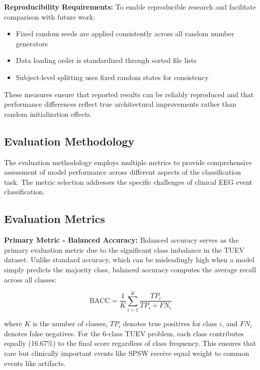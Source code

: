 \textbf{Reproducibility Requirements:} To enable reproducible research and facilitate comparison with future work:
\begin{itemize}
    \item Fixed random seeds are applied consistently across all random number generators
    \item Data loading order is standardized through sorted file lists
    \item Subject-level splitting uses fixed random states for consistency
\end{itemize}

These measures ensure that reported results can be reliably reproduced and that performance differences reflect true architectural improvements rather than random initialization effects.

\subsection{Evaluation Methodology}
\label{sec:evaluation_methodology}

The evaluation methodology employs multiple metrics to provide comprehensive assessment of model performance across different aspects of the classification task. The metric selection addresses the specific challenges of clinical \ac{EEG} event classification.

\subsection{Evaluation Metrics}
\label{sec:evaluation_metrics}

\textbf{Primary Metric - Balanced Accuracy:} Balanced accuracy serves as the primary evaluation metric due to the significant class imbalance in the \ac{TUEV} dataset. Unlike standard accuracy, which can be misleadingly high when a model simply predicts the majority class, balanced accuracy computes the average recall across all classes:

\begin{equation}
\text{BACC} = \frac{1}{K} \sum_{i=1}^{K} \frac{TP_i}{TP_i + FN_i}
\end{equation}

where $K$ is the number of classes, $TP_i$ denotes true positives for class $i$, and $FN_i$ denotes false negatives. For the 6-class \ac{TUEV} problem, each class contributes equally (16.67\%) to the final score regardless of class frequency. This ensures that rare but clinically important events like \ac{SPSW} receive equal weight to common events like artifacts.

